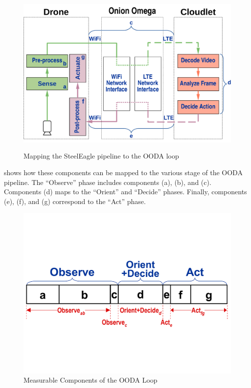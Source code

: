 \begin{figure}[htbp]
\centering
\includegraphics[width = .6\textwidth]{figs/fig-ooda-loop.pdf}\\
\caption{Mapping the SteelEagle pipeline to the OODA loop}
\label{fig:ooda-mapping}
\end{figure}

 shows how these components can be mapped to the various
stage of the OODA pipeline. The ``Observe'' phase includes components (a), (b),
and (c). Components (d) maps to the ``Orient'' and ``Decide'' phases. Finally,
components (e), (f), and (g) correspond to the ``Act'' phase.

\begin{figure}[htbp]
\centerline{\includegraphics[width = .5\textwidth]{figs/fig-ooda-nomenclature.pdf}}
\caption{Measurable Components of the OODA Loop}
\label{fig:ooda-nomenclature}
\end{figure}

